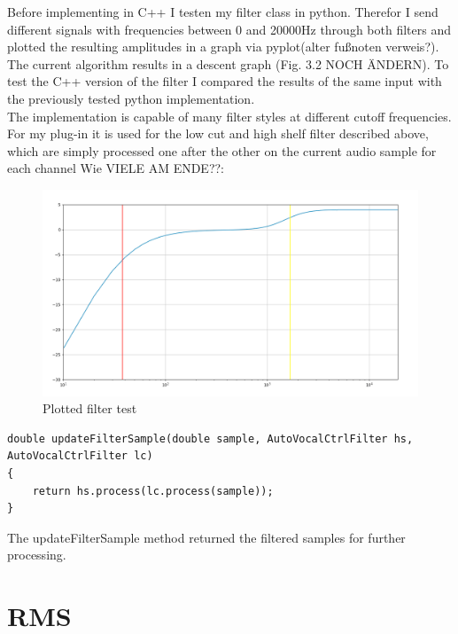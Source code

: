 Before implementing in C++ I testen my filter class in python. Therefor I send different signals with frequencies between 0 and 20000Hz through both filters and plotted the resulting amplitudes in a graph via pyplot(alter fußnoten verweis?). The current algorithm results in a descent graph (Fig. 3.2 NOCH ÄNDERN). To test the C++ version of the filter I compared the results of the same input with the previously tested python implementation.\\
The implementation is capable of many filter styles at different cutoff frequencies. For my plug-in it is used for the low cut and high shelf filter described above, which are simply processed one after the other on the current audio sample for each channel Wie VIELE AM ENDE??:\\
\begin{figure}
\includegraphics[width=\textwidth]{images/filter_test}
\caption{Plotted filter test}
\end{figure}

\begin{lstlisting}[frame=single]
double updateFilterSample(double sample, AutoVocalCtrlFilter hs,
AutoVocalCtrlFilter lc)
{
    return hs.process(lc.process(sample));
}
\end{lstlisting}

The updateFilterSample method returned the filtered samples for further processing.\\

\section{RMS}

